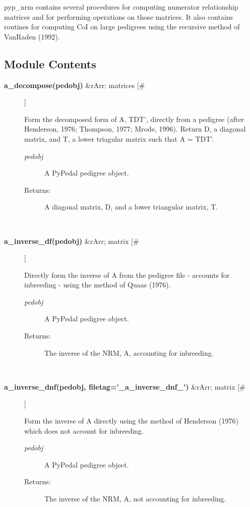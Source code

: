 

 pyp\_nrm contains several procedures for computing numerator relationship matrices and for performing operations on those matrices. It also contains routines for computing CoI on large pedigrees using the recursive method of VanRaden (1992).
\subsection*{Module Contents}
\begin{description}
\item[\textbf{a\_decompose(pedobj)}
 \&rArr; matrices [\#]]

 Form the decomposed form of A, TDT', directly from a pedigree (after Henderson, 1976; Thompson, 1977; Mrode, 1996). Return D, a diagonal matrix, and T, a lower triagular matrix such that A = TDT'.
\begin{description}
\item[\emph{pedobj}
] A PyPedal pedigree object.
\item[Returns:] A diagonal matrix, D, and a lower triangular matrix, T.

\end{description}
\\ 

\item[\textbf{a\_inverse\_df(pedobj)}
 \&rArr; matrix [\#]]

 Directly form the inverse of A from the pedigree file - accounts for inbreeding - using the method of Quaas (1976).
\begin{description}
\item[\emph{pedobj}
] A PyPedal pedigree object.
\item[Returns:] The inverse of the NRM, A, accounting for inbreeding.

\end{description}
\\ 

\item[\textbf{a\_inverse\_dnf(pedobj, filetag='\_a\_inverse\_dnf\_')}
 \&rArr; matrix [\#]]

 Form the inverse of A directly using the method of Henderson (1976) which does not account for inbreeding.
\begin{description}
\item[\emph{pedobj}
] A PyPedal pedigree object.
\item[Returns:] The inverse of the NRM, A, not accounting for inbreeding.


\end{description}
\end{description}
